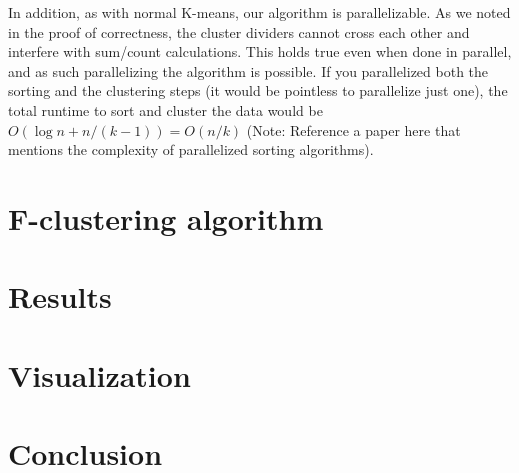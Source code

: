 \documentclass[conference,compsoc]{IEEEtran}
\begin{document}
In addition, as with normal K-means, our algorithm is parallelizable.
As we noted in the proof of correctness, the cluster dividers cannot cross each other and interfere with sum/count calculations.
This holds true even when done in parallel, and as such parallelizing the algorithm is possible.
If you parallelized both the sorting and the clustering steps (it would be pointless to parallelize just one), 
the total runtime to sort and cluster the data would be $O(\log n + n/(k-1)) = O(n/k)$ (Note: Reference a paper here that mentions the complexity of parallelized sorting algorithms).

\section{F-clustering algorithm}

\section{Results}

\section{Visualization}

\section{Conclusion}
\end{document}
